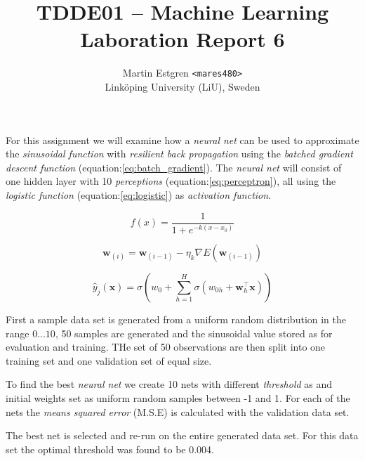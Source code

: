 \documentclass[a4paper, 12p]{article}
\title{TDDE01 -- Machine Learning \\
Laboration Report 6}
\author{{Martin Estgren \texttt{<mares480>}} \\
{Linköping University (LiU), Sweden}}
\begin{document}
    \maketitle %
    
    For this assignment we will examine how a \textit{neural net} can be used to approximate the \textit{sinusoidal function} with \textit{resilient back propagation} using the \textit{batched gradient descent function} (equation:\ref{eq:batch_gradient}). The \textit{neural net} will consist of one hidden layer with 10 \textit{perceptions} (equation:\ref{eq:perceptron}), all using the \textit{logistic function} (equation:\ref{eq:logistic}) as \textit{activation function}. 

   \begin{equation} \label{eq:logistic}
        f(x) = \frac{1}{1 + e^{-k(x-x_0)}}
    \end{equation}

    \begin{equation} \label{eq:batch_gradient}
        \bm{w}_{(i)} = \bm{w}_{(i-1)} - \eta_k \nabla E(\bm{w}_{(i-1)})
    \end{equation}

    \begin{equation} \label{eq:perceptron}
        \hat{y}_j(\bm{x}) = \sigma(w_0 + \sum_{h=1}^{H} \sigma(w_{0h} + \bm{w}_h^\intercal\bm{x}))
    \end{equation}

    First a sample data set is generated from a uniform random distribution in the range \(0...10\), 50 samples are generated and the sinusoidal value stored as for evaluation and training. THe set of 50 observations are then split into one training set and one validation set of equal size.

    

    To find the best \textit{neural net} we create 10 nets with different \textit{threshold} as and initial weights set as uniform random samples between -1 and 1. For each of the nets the \textit{means squared error} (M.S.E) is calculated with the validation data set. 

    

    The best net is selected and re-run on the entire generated data set. For this data set the optimal threshold was found to be 0.004. 

    
\end{document}
